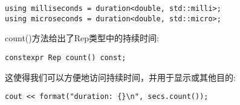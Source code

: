 \begin{lstlisting}[style=styleCXX]
using milliseconds = duration<double, std::milli>;
using microseconds = duration<double, std::micro>;
\end{lstlisting}

count()方法给出了Rep类型中的持续时间:

\begin{lstlisting}[style=styleCXX]
constexpr Rep count() const;
\end{lstlisting}

这使得我们可以方便地访问持续时间，并用于显示或其他目的:

\begin{lstlisting}[style=styleCXX]
cout << format("duration: {}\n", secs.count());
\end{lstlisting}
















